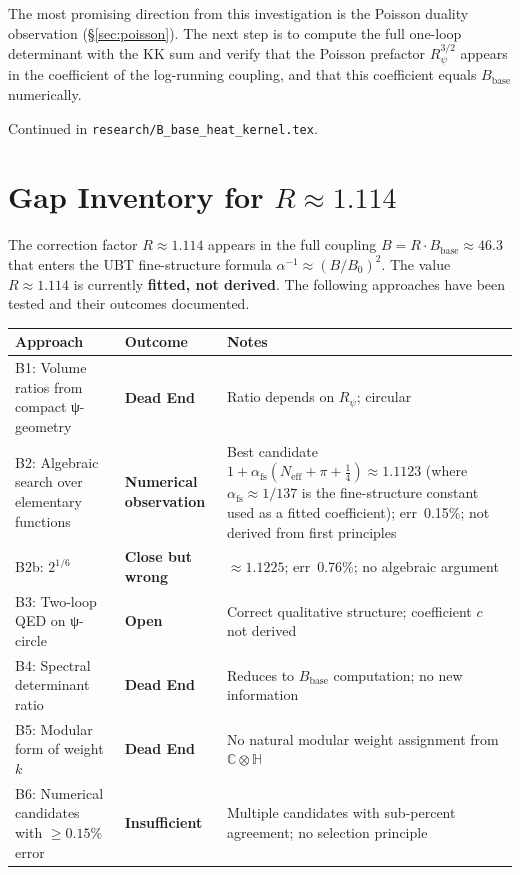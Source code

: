 \documentclass[11pt,a4paper]{article}
\begin{document}
The most promising direction from this investigation is the Poisson duality
observation (§\ref{sec:poisson}).  The next step is to compute the full
one-loop determinant with the KK sum and verify that the Poisson prefactor
$R_\psi^{3/2}$ appears in the coefficient of the log-running coupling, and
that this coefficient equals $B_{\mathrm{base}}$ numerically.

Continued in \texttt{research/B\_base\_heat\_kernel.tex}.

\section{Gap Inventory for $R \approx 1.114$}
\label{sec:r_factor_gaps}


The correction factor $R \approx 1.114$ appears in the full coupling
$B = R \cdot B_{\mathrm{base}} \approx 46.3$ that enters the UBT
fine-structure formula $\alpha^{-1} \approx (B/B_0)^2$.
The value $R \approx 1.114$ is currently \textbf{fitted, not derived}.
The following approaches have been tested and their outcomes documented.

\begin{center}
\begin{tabular}{p{5cm}p{4.5cm}p{4cm}}
\hline
\textbf{Approach} & \textbf{Outcome} & \textbf{Notes} \\
\hline
B1: Volume ratios from compact ψ-geometry &
  \textbf{Dead End} &
  Ratio depends on $R_\psi$; circular \\
B2: Algebraic search over elementary functions &
  \textbf{Numerical observation} &
  Best candidate $1+\alpha_\mathrm{fs}(N_\mathrm{eff}+\pi+\tfrac{1}{4}) \approx 1.1123$ (where $\alpha_\mathrm{fs} \approx 1/137$ is the fine-structure constant used as a fitted coefficient); err~0.15\%; not derived from first principles \\
B2b: $2^{1/6}$ &
  \textbf{Close but wrong} &
  $\approx 1.1225$; err~0.76\%; no algebraic argument \\
B3: Two-loop QED on ψ-circle &
  \textbf{Open} &
  Correct qualitative structure; coefficient $c$ not derived \\
B4: Spectral determinant ratio &
  \textbf{Dead End} &
  Reduces to $B_{\mathrm{base}}$ computation; no new information \\
B5: Modular form of weight $k$ &
  \textbf{Dead End} &
  No natural modular weight assignment from $\mathbb{C}\otimes\mathbb{H}$ \\
B6: Numerical candidates with $\geq 0.15\%$ error &
  \textbf{Insufficient} &
  Multiple candidates with sub-percent agreement; no selection principle \\
\hline
\end{tabular}
\end{center}
\end{document}
